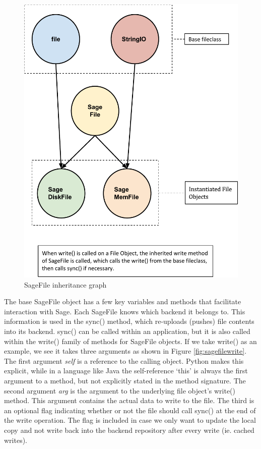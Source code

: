 \begin{figure}[h]
\centering
\includegraphics[scale=0.7]{figures/sagefile}
\caption{SageFile inheritance graph}
\label{fig:sagefile}
\end{figure}

The base SageFile object has a few key variables and methods that facilitate interaction with Sage. Each SageFile knows which backend it belongs to.  This information is used in the sync() method, which re-uploads (pushes) file contents into its backend. sync() can be called within an application, but it is also called within the write() family of methods for SageFile objects. If we take write() as an example, we see it takes three arguments as shown in Figure \ref{fig:sagefilewrite}.  The first argument \textit{self} is a reference to the calling object. Python makes this explicit, while in  a language like Java the self-reference `this' is always the first argument to a method,  but not explicitly stated in the method signature. The second argument \textit{arg} is the argument to the underlying file object's write() method. This argument contains the actual data to write to the file. The third is an optional flag indicating whether or not the file should call sync() at the end of the write operation. The flag is included in case we only want to update the local copy and not write back into the backend repository after every write (ie. cached writes). 

